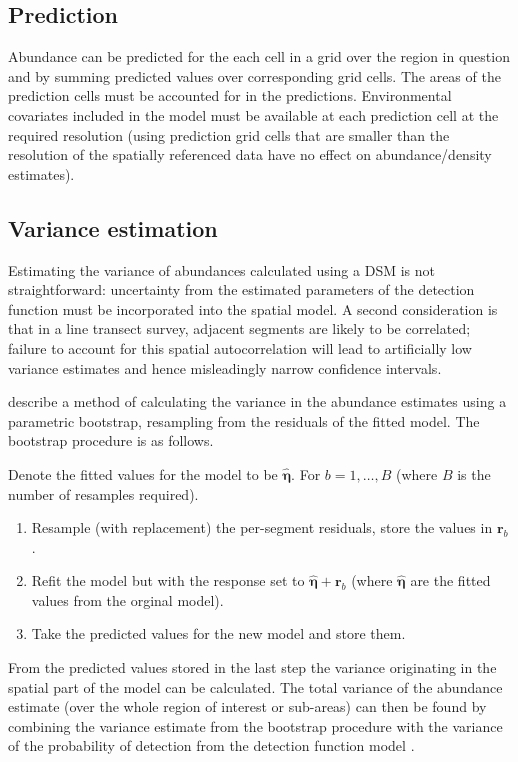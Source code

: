 \documentclass[a4paper,12pt]{article}
\begin{document}
\subsection*{Prediction}

Abundance can be predicted for the each cell in a grid over the region in question and by summing predicted values over corresponding grid cells. The areas of the prediction cells must be accounted for in the predictions. Environmental covariates included in the model must be available at each prediction cell at the required resolution (using prediction grid cells that are smaller than the resolution of the spatially referenced data have no effect on abundance/density estimates).  

\subsection*{Variance estimation}

Estimating the variance of abundances calculated using a DSM is not straightforward: uncertainty from the estimated parameters of the detection function must be incorporated into the spatial model. A second consideration is that in a line transect survey, adjacent segments are likely to be correlated; failure to account for this spatial autocorrelation will lead to artificially low variance estimates and hence misleadingly narrow confidence intervals.

\cite{Hedley:2004et} describe a method of calculating the variance in the abundance estimates using a parametric bootstrap, resampling from the residuals of the fitted model. The bootstrap procedure is as follows.

Denote the fitted values for the model to be $\hat{\bm{\eta}}$. For $b=1,\ldots,B$ (where $B$ is the number of resamples required).
\begin{enumerate}
	\item Resample (with replacement) the per-segment residuals, store the values in $\mathbf{r}_{b}$.
	\item Refit the model but with the response set to $\hat{\bm{\eta}}+\mathbf{r}_{b}$ (where $\hat{\bm{\eta}}$ are the fitted values from the orginal model).
	\item Take the predicted values for the new model and store them.
\end{enumerate}
From the predicted values stored in the last step the variance originating in the spatial part of the model can be calculated. The total variance of the abundance estimate (over the whole region of interest or sub-areas) can then be found by combining the variance estimate from the bootstrap procedure with the variance of the probability of detection from the detection function model \citep[using the delta method which assumes that the two components of the variance are independent;][]{Seber:2002ti}.
\end{document}
